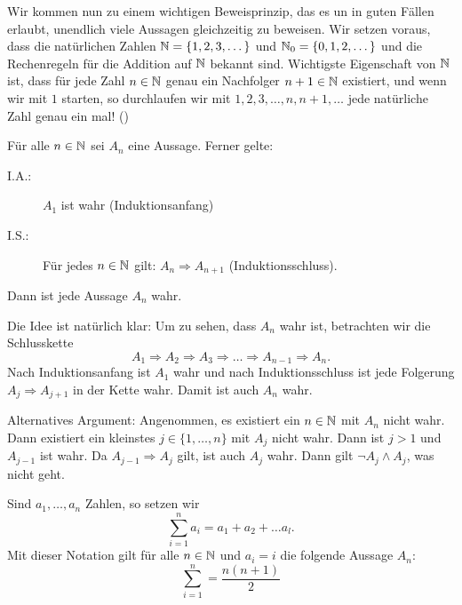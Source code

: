 Wir kommen nun zu einem wichtigen Beweisprinzip, das es un in guten Fällen erlaubt, unendlich viele Aussagen gleichzeitig zu beweisen. Wir setzen voraus, dass die natürlichen Zahlen $\mathbb{N} = \{1,2,3,\dots\}$ und $\mathbb{N}_0 = \{0,1,2,\dots\}$ und die Rechenregeln für die Addition auf $\mathbb{N}$ bekannt sind.
Wichtigste Eigenschaft von $\mathbb{N}$ ist, dass für jede Zahl $n \in \mathbb{N}$ genau ein Nachfolger $n+1 \in \mathbb{N}$ existiert, und wenn wir mit $1$ starten, so durchlaufen wir mit $1,2,3,\dots, n, n+1, \dots$ jede natürliche Zahl genau ein mal! ()

\begin{satz}
	\label{satz:I.1.8}
	Für alle $n \in \mathbb{N}$ sei $A_n$ eine Aussage. 
	Ferner gelte:
	\begin{description}
		\item[I.A.:] $A_1$ ist wahr (Induktionsanfang)
		\item[I.S.:] Für jedes $n \in \mathbb{N}$ gilt: $A_n \Rightarrow A_{n+1}$ (Induktionsschluss).
	\end{description}
	Dann ist jede Aussage $A_n$ wahr.
\end{satz}

Die Idee ist natürlich klar:
Um zu sehen, dass $A_n$ wahr ist, betrachten wir die Schlusskette
\[
	A_1 \Rightarrow A_2 \Rightarrow A_3 \Rightarrow \dots \Rightarrow A_{n-1} \Rightarrow A_n.
\]
Nach Induktionsanfang ist $A_1$ wahr und nach Induktionsschluss ist jede Folgerung $A_j \Rightarrow A_{j+1}$ in der Kette wahr.
Damit ist auch $A_n$ wahr.

Alternatives Argument:
Angenommen, es existiert ein $n \in \mathbb{N}$ mit $A_n$ nicht wahr.
Dann existiert ein kleinstes $j \in \{1,\dots,n\}$ mit $A_j$ nicht wahr.
Dann ist $j > 1 $ und $A_{j-1}$ ist wahr.
Da $A_{j-1} \Rightarrow A_j$ gilt, ist auch $A_j$ wahr.
Dann gilt $\neg A_j \wedge A_j$, was nicht geht.

\begin{beispiel}
	\label{bsp:I.1.9}
	Sind $a_1,\dots,a_n$ Zahlen, so setzen wir
	\[
		\sum_{i=1}^{n} a_i = a_1 + a_2 + \dots a_l.
	\]
	Mit dieser Notation gilt für alle $n \in \mathbb{N}$ und $a_i = i$ die folgende Aussage $A_n$:
	\[
		\sum_{i=1}^{n} = \frac{n(n+1)}{2}
	\]
\end{beispiel}

